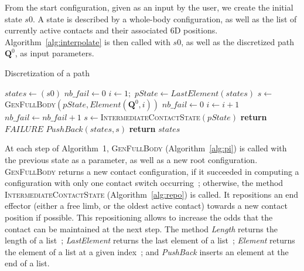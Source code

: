 \documentclass[journal]{IEEEtran}
\begin{document}
From the start configuration, given as an input by the user,
we create the initial state $s0$. A state is described by a whole-body configuration, as well as the list of currently active contacts and their associated 6D positions.
Algorithm~\ref{alg:interpolate}  is then called with $s0$, as well as the discretized path 
$\mathbf{Q}^0$, as input parameters.

\begin{algorithm}[!tbp]
\caption{Discretization of a path} \label{interpolate}
	\begin{algorithmic}[1]
		\State $states \gets (s0)$ 
		\State $nb\_fail \gets 0$ 
		\State $i \gets 1;$ 
			\State $pState \gets LastElement(states)$
			\State $s \gets$ \textsc{GenFullBody}$(pState, Element(\mathbf{Q}^0,i))$
				\State $nb\_fail \gets 0$
				\State $i \gets i+1$
			\Else
				\State $nb\_fail \gets nb\_fail + 1$
				\State $s \gets $\textsc{IntermediateContactState}$(pState)$
					\State \textbf{return} $FAILURE$
				\EndIf		
			\EndIf
			\State ${PushBack}(states, s)$
		\EndWhile
		\State \textbf{return} $states$
	\EndFunction
\end{algorithmic}
\label{alg:interpolate}
\end{algorithm}

At each step of Algorithm~1, \textsc{GenFullBody} (Algorithm~\ref{alg:pi}) is called with the previous state as a parameter, as well
as a new root configuration. \textsc{GenFullBody} returns a new contact configuration, if it succeeded
in computing a configuration with only one contact switch occurring~;
otherwise, the method \textsc{IntermediateContactState} (Algorithm~\ref{alg:repo}) is called.
It repositions an end effector (either a free limb, or the oldest active contact) towards a new contact position if possible.
This repositioning allows to increase the odds that the contact can be maintained at the next step.
The method \textit{Length} returns the length of a list~; \textit{LastElement} returns the last element
of a list~; \textit{Element} returns the element of a list at a given index~; and \textit{PushBack} inserts an element at the end of a list.
\end{document}
